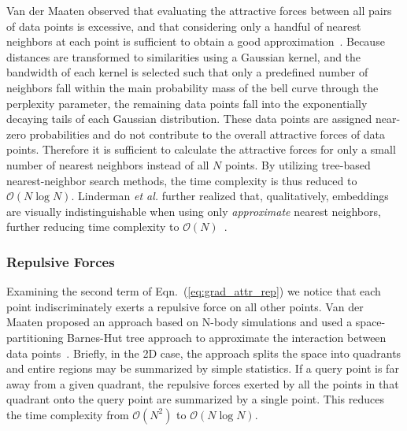 \documentclass[twocolumn]{article}
\begin{document}
Van der Maaten observed that evaluating the attractive forces between all pairs
of data points is excessive, and that considering only a handful of nearest
neighbors at each point is sufficient to obtain a good
approximation~\cite{van2014accelerating}.  Because distances are transformed to
similarities using a Gaussian kernel, and the bandwidth of each kernel is
selected such that only a predefined number of neighbors fall within the main
probability mass of the bell curve through the perplexity parameter, the
remaining data points fall into the exponentially decaying tails of each
Gaussian distribution.  These data points are assigned near-zero probabilities
and do not contribute to the overall attractive forces of data points.
Therefore it is sufficient to calculate the attractive forces for only a small
number of nearest neighbors instead of all $N$ points. By utilizing tree-based
nearest-neighbor search methods, the time complexity is thus reduced to
$\mathcal{O}(N \log N)$. Linderman \textit{et al.} further realized that,
qualitatively, embeddings are visually indistinguishable when using only
\textit{approximate} nearest neighbors, further reducing time complexity to
$\mathcal{O}(N)$~\cite{linderman2019fast}.

\subsubsection*{Repulsive Forces}

Examining the second term of Eqn.~(\ref{eq:grad_attr_rep}) we notice that each
point indiscriminately exerts a repulsive force on all other points. Van der
Maaten proposed an approach based on N-body simulations and used a
space-partitioning Barnes-Hut tree approach to approximate the interaction
between data points~\cite{van2014accelerating}. Briefly, in the 2D case, the
approach splits the space into quadrants and entire regions may be summarized by
simple statistics.  If a query point is far away from a given quadrant, the
repulsive forces exerted by all the points in that quadrant onto the query point
are summarized by a single point. This reduces the time complexity from
$\mathcal{O}(N^2)$ to $\mathcal{O}(N \log N)$.
\end{document}

